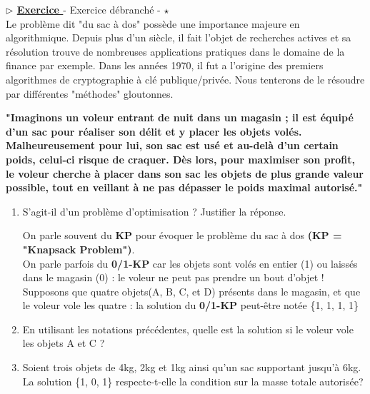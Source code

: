 \documentclass[12pt,french]{article}
\newcounter{npb}
\newcommand{\exo}{
    \stepcounter{npb}
    {\textbf{$\triangleright$ \underline{Exercice \arabic{npb} }}}
}
\begin{document}
\medskip
\exo  - Exercice débranché - $\star$ \\
Le problème dit "du sac à dos" possède une importance majeure en algorithmique. Depuis plus d'un siècle, il fait l'objet de recherches actives et sa résolution trouve de nombreuses applications pratiques dans le domaine de la finance par exemple. Dans les années 1970, il fut a l'origine des premiers algorithmes de cryptographie à clé publique/privée. Nous tenterons de le résoudre par différentes "méthodes" gloutonnes.\\
\vspace{3mm}
\begin{tcolorbox}[enhanced,attach boxed title to top center={yshift=-3mm,yshifttext=-1mm},
	colback=red!5!white,colframe=red!75!black,colbacktitle=red!25!black,
	title=Enoncé du problème, fonttitle=\bfseries,
	boxed title style={size=small,colframe=red!25!black} ]
	\textbf{"Imaginons un voleur entrant de nuit dans un magasin ; il est équipé  d'un sac pour réaliser son délit et y placer les objets volés. Malheureusement pour lui, son sac est usé et au-delà d'un certain poids, celui-ci risque de craquer. Dès lors, pour maximiser son profit, le voleur cherche à placer dans son sac les objets de plus grande valeur possible, tout en veillant à ne pas dépasser le poids maximal autorisé."}
\end{tcolorbox}
\vspace{2mm}
\begin{enumerate}
	\item S'agit-il d'un problème d'optimisation ? Justifier la réponse.
	\begin{tcolorbox}[enhanced,attach boxed title to top center={yshift=-3mm,yshifttext=-1mm},
		colback=red!5!white,colframe=red!75!black,colbacktitle=red!25!black,
		title=Notations, fonttitle=\bfseries,
		boxed title style={size=small,colframe=red!25!black} ]
		On parle souvent du \textbf{KP} pour évoquer le problème du sac à dos  \textbf{(KP = "Knapsack Problem")}.\\
		On parle parfois du \textbf{0/1-KP} car les objets sont volés en entier (1) ou laissés dans le magasin (0) : le voleur ne peut pas prendre un bout d'objet ! Supposons que  quatre objets(A, B, C, et D) présents dans le magasin, et que le voleur vole les quatre : la solution du  \textbf{0/1-KP} peut-être notée \{1, 1, 1, 1\}
	\end{tcolorbox}
\item En utilisant les notations précédentes, quelle est la solution si le voleur vole les objets A et C ?
\item Soient trois objets de 4kg, 2kg et 1kg ainsi qu'un sac supportant jusqu'à 6kg. La solution \{1, 0, 1\} respecte-t-elle la condition sur la masse totale autorisée?

\end{enumerate} 
\newpage
\end{document}
